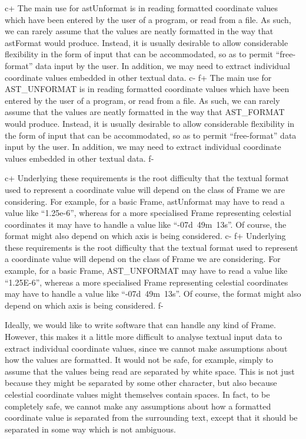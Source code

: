 \documentclass[twoside,11pt]{starlink}
\begin{document}
c+
The main use for astUnformat is in reading formatted coordinate values
which have been entered by the user of a program, or read from a
file. As such, we can rarely assume that the values are neatly
formatted in the way that astFormat would produce. Instead, it is
usually desirable to allow considerable flexibility in the form of
input that can be accommodated, so as to permit ``free-format'' data
input by the user. In addition, we may need to extract individual
coordinate values embedded in other textual data.
c-
f+
The main use for AST\_UNFORMAT is in reading formatted coordinate
values which have been entered by the user of a program, or read from
a file. As such, we can rarely assume that the values are neatly
formatted in the way that AST\_FORMAT would produce. Instead, it is
usually desirable to allow considerable flexibility in the form of
input that can be accommodated, so as to permit ``free-format'' data
input by the user. In addition, we may need to extract individual
coordinate values embedded in other textual data.
f-

c+
Underlying these requirements is the root difficulty that the textual
format used to represent a coordinate value will depend on the class
of Frame we are considering. For example, for a basic Frame,
astUnformat may have to read a value like ``1.25e-6'', whereas for a
more specialised Frame representing celestial coordinates it may have
to handle a value like ``-07d~49m~13s''. Of course, the format might
also depend on which axis is being considered.
c-
f+
Underlying these requirements is the root difficulty that the textual
format used to represent a coordinate value will depend on the class
of Frame we are considering. For example, for a basic Frame,
AST\_UNFORMAT may have to read a value like ``1.25E-6'', whereas a
more specialised Frame representing celestial coordinates may have to
handle a value like ``-07d~49m~13s''. Of course, the format might also
depend on which axis is being considered.
f-

Ideally, we would like to write software that can handle any kind of
Frame. However, this makes it a little more difficult to analyse
textual input data to extract individual coordinate values, since we
cannot make assumptions about how the values are formatted. It would
not be safe, for example, simply to assume that the values being read
are separated by white space. This is not just because they might be
separated by some other character, but also because celestial
coordinate values might themselves contain spaces. In fact, to be
completely safe, we cannot make any assumptions about how a formatted
coordinate value is separated from the surrounding text, except that
it should be separated in some way which is not ambiguous.
\end{document}
